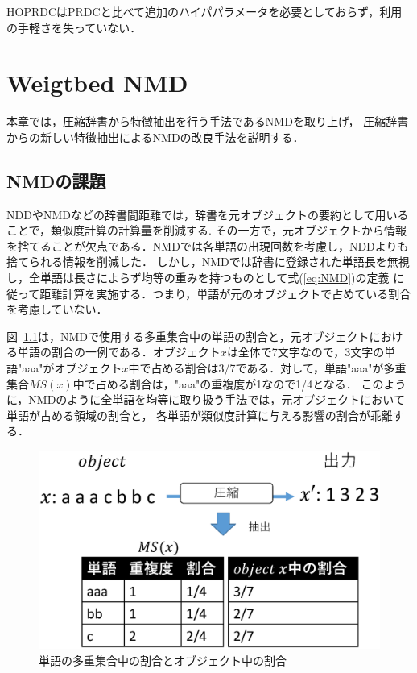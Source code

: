 HOPRDCはPRDCと比べて追加のハイパパラメータを必要としておらず，利用の手軽さを失っていない．

\chapter{Weigtbed NMD} %
本章では，圧縮辞書から特徴抽出を行う手法であるNMDを取り上げ，
圧縮辞書からの新しい特徴抽出によるNMDの改良手法を説明する．
\label{sec:nmdの改良_仮_}
\section{NMDの課題}
NDDやNMDなどの辞書間距離では，辞書を元オブジェクトの要約として用いることで，類似度計算の計算量を削減する.
その一方で，元オブジェクトから情報を捨てることが欠点である．NMDでは各単語の出現回数を考慮し，NDDよりも捨てられる情報を削減した．
しかし，NMDでは辞書に登録された単語長を無視し，全単語は長さによらず均等の重みを持つものとして式(\ref{eq:NMD})の定義
に従って距離計算を実施する．つまり，単語が元のオブジェクトで占めている割合を考慮していない．

図~\ref{fig:image/NMD_Task.eps}は，NMDで使用する多重集合中の単語の割合と，元オブジェクトにおける単語の割合の一例である．オブジェクト$x$は全体で7文字なので，3文字の単語"aaa"がオブジェクト$x$中で占める割合は3/7である．対して，単語"aaa"が多重集合$MS(x)$中で占める割合は，"aaa"の重複度が1なので1/4となる．
このように，NMDのように全単語を均等に取り扱う手法では，元オブジェクトにおいて単語が占める領域の割合と，
各単語が類似度計算に与える影響の割合が乖離する．

\begin{figure}[tb]
\begin{center}
\includegraphics[clip, width=\columnwidth]{image/NMD_Task.eps}
\caption{単語の多重集合中の割合とオブジェクト中の割合}
\label{fig:image/NMD_Task.eps}
\end{center}
\end{figure}


